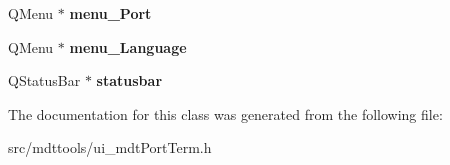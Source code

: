 \begin{DoxyCompactItemize}
\item 
\hypertarget{class_ui__mdt_port_term_a432f9e70278ef43133af282fba27092f}{
QMenu $\ast$ {\bfseries menu\_\-Port}}
\label{class_ui__mdt_port_term_a432f9e70278ef43133af282fba27092f}

\item 
\hypertarget{class_ui__mdt_port_term_a76b28956d67d1b795842eac918dadb49}{
QMenu $\ast$ {\bfseries menu\_\-Language}}
\label{class_ui__mdt_port_term_a76b28956d67d1b795842eac918dadb49}

\item 
\hypertarget{class_ui__mdt_port_term_ae922f4e6f3b8aa1db954038b8e335254}{
QStatusBar $\ast$ {\bfseries statusbar}}
\label{class_ui__mdt_port_term_ae922f4e6f3b8aa1db954038b8e335254}

\end{DoxyCompactItemize}


The documentation for this class was generated from the following file:\begin{DoxyCompactItemize}
\item 
src/mdttools/ui\_\-mdtPortTerm.h\end{DoxyCompactItemize}
